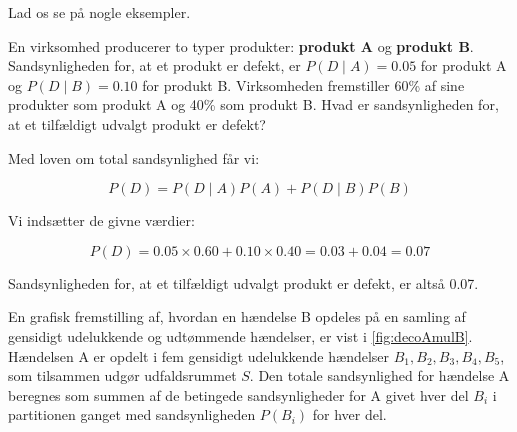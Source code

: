 Lad os se på nogle eksempler.

\begin{example}
    En virksomhed producerer to typer produkter: \textbf{produkt A} og \textbf{produkt B}. Sandsynligheden for, at et produkt er defekt, er \( P(D \mid A) = 0.05 \) for produkt A og \( P(D \mid B) = 0.10 \) for produkt B. Virksomheden fremstiller 60\% af sine produkter som produkt A og 40\% som produkt B. Hvad er sandsynligheden for, at et tilfældigt udvalgt produkt er defekt?
\end{example}

\begin{solution}
    Med loven om total sandsynlighed får vi:

    \[
    P(D) = P(D \mid A) P(A) + P(D \mid B) P(B)
    \]

    Vi indsætter de givne værdier:

    \[
    P(D) = 0.05 \times 0.60 + 0.10 \times 0.40 = 0.03 + 0.04 = 0.07
    \]

    Sandsynligheden for, at et tilfældigt udvalgt produkt er defekt, er altså 0.07.
\end{solution}

En grafisk fremstilling af, hvordan en hændelse B opdeles
på en samling af gensidigt udelukkende og udtømmende hændelser, er vist i \autoref{fig:decoAmulB}. Hændelsen A er opdelt i fem gensidigt udelukkende hændelser \( B_1, B_2, B_3, B_4, B_5 \), som tilsammen udgør udfaldsrummet \( S \). Den totale sandsynlighed for hændelse A beregnes som summen af de betingede sandsynligheder for A givet hver del \( B_i \) i partitionen ganget med sandsynligheden \( P(B_i) \) for hver del.

